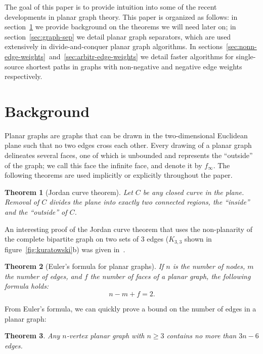 \documentclass[11pt]{article}
\newtheorem{theorem}{Theorem}[section]
\begin{document}
The goal of this paper is to provide intuition into some of the recent developments in planar graph theory. This paper is organized as follows: in section~\ref{sec:background} we provide background on the theorems we will need later on; in section~\ref{sec:graph-sep} we detail planar graph separators, which are used extensively in divide-and-conquer planar graph algorithms. In sections~\ref{sec:nonn-edge-weights}~and~\ref{sec:arbitr-edge-weights} we detail faster algorithms for single-source shortest paths in graphs with non-negative and  negative edge weights respectively.

\section{Background}
\label{sec:background}

Planar graphs are graphs that can be drawn in the two-dimensional Euclidean plane such that no two edges cross each other. Every drawing of a planar graph delineates several faces, one of which is unbounded and represents the ``outside'' of the graph; we call this face the infinite face, and denote it by $f_{\infty}$. The following theorems are used implicitly or explicitly throughout the paper.\\

\begin{theorem}[Jordan curve theorem]
  Let $C$ be any closed curve in the plane. Removal of $C$ divides the plane into exactly two connected regions, the ``inside'' and the ``outside'' of $C$.
\end{theorem}

An interesting proof of the Jordan curve theorem that uses the non-planarity of the complete bipartite graph on two sets of 3 edges ($K_{3,3}$ shown in figure~\ref{fig:kuratowski}b) was given in~\cite{thomassen1992jordan}.\\

\begin{theorem}[Euler's formula for planar graphs]
  If $n$ is the number of nodes, $m$ the number of edges, and $f$ the number of faces of a planar graph, the following formula holds:
\[
  n - m + f = 2.
\]
\end{theorem}

From Euler's formula, we can quickly prove a bound on the number of edges in a planar graph:\\

\begin{theorem}
  Any $n$-vertex planar graph with $n \geq 3$ contains no more than $3n-6$ edges.\\
\end{theorem}
\end{document}
